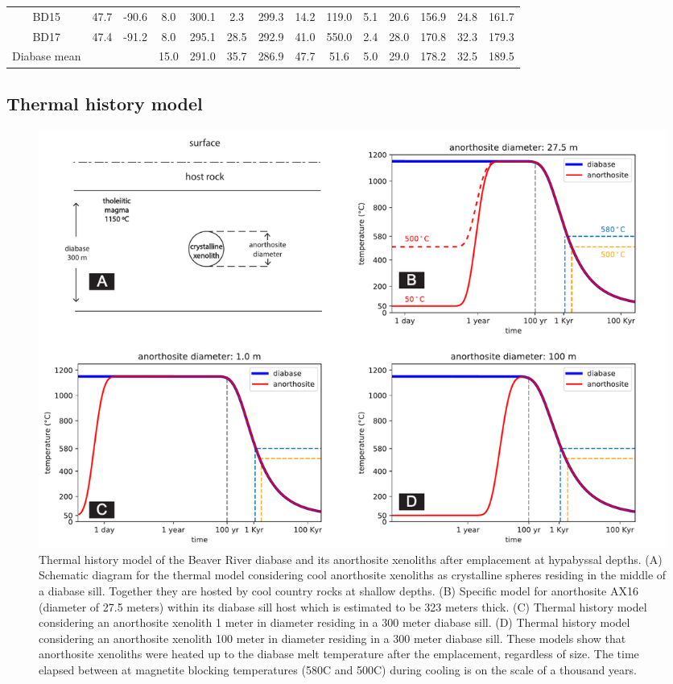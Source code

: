 \begin{table}
\begin{tabular}{cccccccccccccc}
BD15             & 47.7 & -90.6 & 8.0  & 300.1   & 2.3          & 299.3   & 14.2    & 119.0 & 5.1                     & 20.6        & 156.9       & 24.8         & 161.7        \\
BD17             & 47.4 & -91.2 & 8.0  & 295.1   & 28.5         & 292.9   & 41.0    & 550.0 & 2.4                     & 28.0        & 170.8       & 32.3         & 179.3        \\
\hline
Diabase mean     &      &       & 15.0 & 291.0   & 35.7         & 286.9   & 47.7    & 51.6  & 5.0                     & 29.0        & 178.2       & 32.5         & 189.5       \\
\hline
\end{tabular}
\label{tab:Pmag_site_data}
\end{table}


\subsection{Thermal history model}

\begin{figure}
\noindent\includegraphics[width=\textwidth]{figure/Zhang2021/thermal_history_model.pdf}
\caption[Thermal history model of the Beaver River diabase and its anorthosite xenoliths after emplacement at hypabyssal depths.]{\footnotesize{Thermal history model of the Beaver River diabase and its anorthosite xenoliths after emplacement at hypabyssal depths. (A) Schematic diagram for the thermal model considering cool anorthosite xenoliths as crystalline spheres residing in the middle of a diabase sill. Together they are hosted by cool country rocks at shallow depths. (B) Specific model for anorthosite AX16 (diameter of 27.5 meters) within its diabase sill host which is estimated to be 323 meters thick. (C) Thermal history model considering an anorthosite xenolith 1 meter in diameter residing in a 300 meter diabase sill. (D) Thermal history model considering an anorthosite xenolith 100 meter in diameter residing in a 300 meter diabase sill. These models show that anorthosite xenoliths were heated up to the diabase melt temperature after the emplacement, regardless of size. The time elapsed between at magnetite blocking temperatures (580\textdegree C and 500\textdegree C) during cooling is on the scale of a thousand years.}}
\label{fig:thermal_history_model}
\end{figure}

